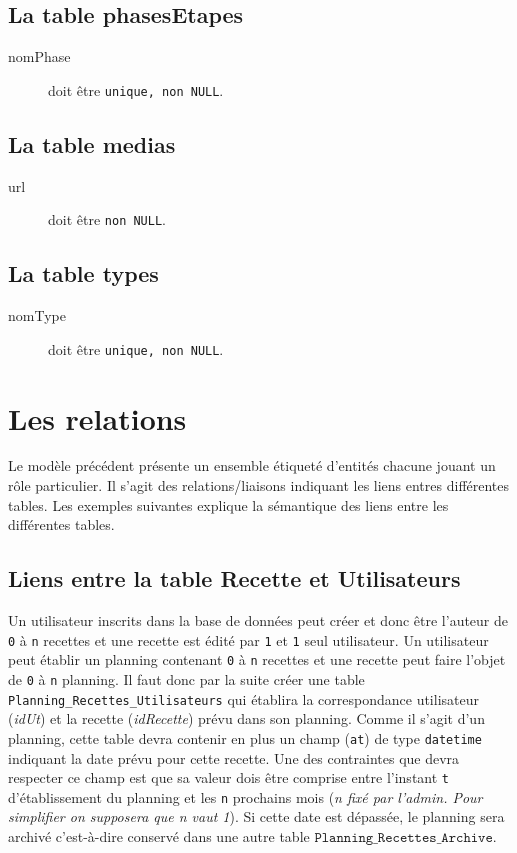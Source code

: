 \subsection{La table phasesEtapes}
\begin{description}
    \item[nomPhase] doit être \texttt{unique, non NULL}.
\end{description}

\subsection{La table medias}
\begin{description}
    \item[url] doit être \texttt{non NULL}.
\end{description}

\subsection{La table types}
\begin{description}
    \item[nomType] doit être \texttt{unique, non NULL}.
\end{description}

\section{Les relations}
Le modèle précédent présente un ensemble étiqueté d'entités chacune jouant un rôle particulier. Il s'agit des relations/liaisons indiquant les liens entres différentes tables. Les exemples suivantes explique la sémantique des liens entre les différentes tables.

\subsection{Liens entre la table Recette et Utilisateurs}
Un utilisateur inscrits dans la base de données peut créer et donc être l'auteur de \texttt{0} à \texttt{n} recettes et une recette est édité par \texttt{1} et \texttt{1} seul utilisateur.
\newline
Un utilisateur peut établir un planning contenant \texttt{0} à \texttt{n} recettes et une recette peut faire l'objet de \texttt{0} à \texttt{n} planning. Il faut donc par la suite créer une table \texttt{Planning\_Recettes\_Utilisateurs} qui établira la correspondance utilisateur (\textit{idUt}) et la recette (\textit{idRecette}) prévu dans son planning.
\newline
Comme il s'agit d'un planning, cette table devra contenir en plus un champ (\texttt{at}) de type \texttt{datetime} indiquant la date prévu pour cette recette.
Une des contraintes que devra respecter ce champ est que sa valeur dois être comprise entre l'instant \texttt{t} d'établissement du planning et les \texttt{n} prochains mois (\textit{n fixé par l'admin. Pour simplifier on supposera que n vaut 1}). 
\newline
Si cette date est dépassée, le planning sera archivé c'est-à-dire conservé dans une autre table \(\texttt{Planning\_Recettes\_Archive}\).


